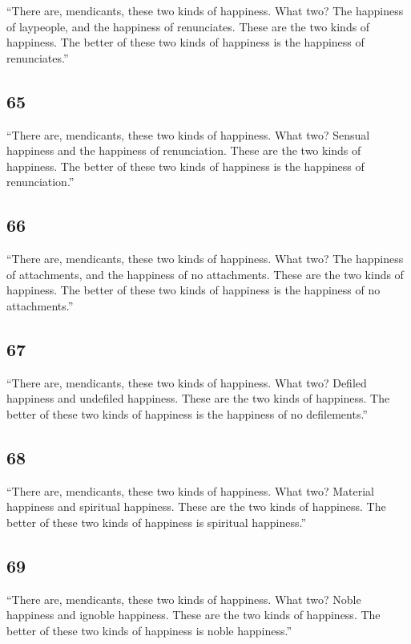 \documentclass[12pt,openany]{book}%
\begin{document}
“There are, mendicants, these two kinds of happiness. What two? The happiness of laypeople, and the happiness of renunciates. These are the two kinds of happiness. The better of these two kinds of happiness is the happiness of renunciates.” 

\subsection*{65 }

“There are, mendicants, these two kinds of happiness. What two? Sensual happiness and the happiness of renunciation. These are the two kinds of happiness. The better of these two kinds of happiness is the happiness of renunciation.” 

\subsection*{66 }

“There are, mendicants, these two kinds of happiness. What two? The happiness of attachments, and the happiness of no attachments. These are the two kinds of happiness. The better of these two kinds of happiness is the happiness of no attachments.” 

\subsection*{67 }

“There are, mendicants, these two kinds of happiness. What two? Defiled happiness and undefiled happiness. These are the two kinds of happiness. The better of these two kinds of happiness is the happiness of no defilements.” 

\subsection*{68 }

“There are, mendicants, these two kinds of happiness. What two? Material happiness and spiritual happiness. These are the two kinds of happiness. The better of these two kinds of happiness is spiritual happiness.” 

\subsection*{69 }

“There are, mendicants, these two kinds of happiness. What two? Noble happiness and ignoble happiness. These are the two kinds of happiness. The better of these two kinds of happiness is noble happiness.” 
\end{document}
